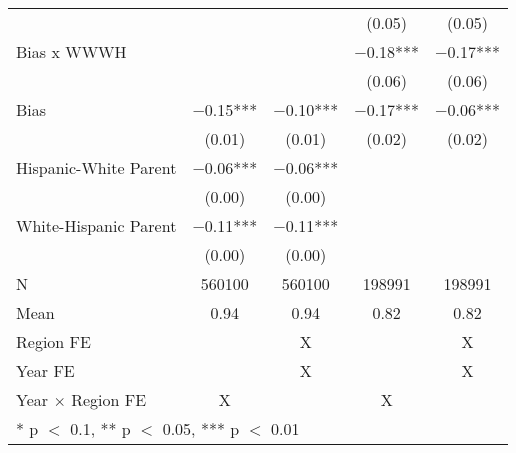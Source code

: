 \begin{ThreePartTable}
\begin{longtable}[t]{lcccc}
 &  &  & (\num{0.05}) & (\num{0.05})\\
Bias x WWWH &  &  & \num{-0.18}*** & \num{-0.17}***\\
 &  &  & (\num{0.06}) & (\num{0.06})\\
Bias & \num{-0.15}*** & \num{-0.10}*** & \num{-0.17}*** & \num{-0.06}***\\
 & (\num{0.01}) & (\num{0.01}) & (\num{0.02}) & (\num{0.02})\\
Hispanic-White Parent & \num{-0.06}*** & \num{-0.06}*** &  & \\
 & (\num{0.00}) & (\num{0.00}) &  \vphantom{1} & \\
White-Hispanic Parent & \num{-0.11}*** & \num{-0.11}*** &  & \\
 & (\num{0.00}) & (\num{0.00}) &  & \\
\midrule
N & \num{560100} & \num{560100} & \num{198991} & \num{198991}\\
Mean & \num{0.94} & \num{0.94} & \num{0.82} & \num{0.82}\\
Region FE &  & X &  & X\\
Year FE &  & X &  & X\\
Year $\times$ Region FE & X &  & X & \\*
\multicolumn{5}{l}{\rule{0pt}{1em}* p $<$ 0.1, ** p $<$ 0.05, *** p $<$ 0.01}\\
\end{longtable}
\end{ThreePartTable}

